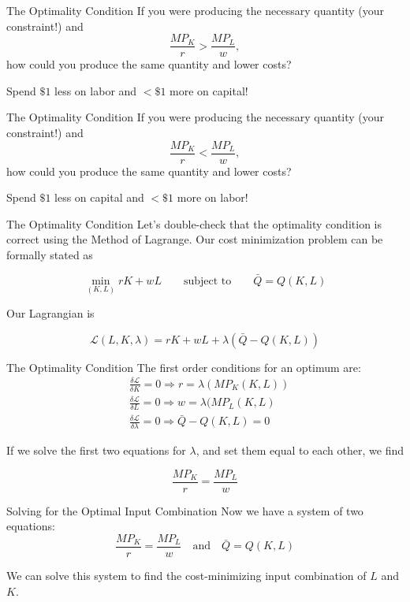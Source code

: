 \documentclass[11pt,t]{beamer}
\begin{document}
\begin{frame}{The Optimality Condition}
  If you were producing the necessary quantity (your constraint!) and 
  $$
    \frac{MP_K}{r} > \frac{MP_L}{w},
  $$
  how could you produce the same quantity and lower costs?

  \pause\bigskip
  Spend $\$1$ less on labor and $<\$1$ more on capital!
\end{frame}

\begin{frame}{The Optimality Condition}
  If you were producing the necessary quantity (your constraint!) and 
  $$
    \frac{MP_K}{r} < \frac{MP_L}{w},
  $$
  how could you produce the same quantity and lower costs?

  \pause\bigskip
  Spend $\$1$ less on capital and $<\$1$ more on labor!
\end{frame}


\begin{frame}{The Optimality Condition}
  Let's double-check that the optimality condition is correct using the Method of Lagrange. Our cost minimization problem can be formally stated as

  $$
    \min_{(K,L)} rK + wL \qquad \text{subject to} \qquad \bar{Q} = Q(K,L)
  $$

  \bigskip
  Our Lagrangian is

  $$
    \mathcal{L}(L,K,\lambda) = rK + wL + \lambda(\bar{Q} - Q(K,L))
  $$
\end{frame}

\begin{frame}{The Optimality Condition}
  The first order conditions for an optimum are:
  \begin{align*}
      & \frac{\delta \mathcal{L}}{\delta K}=0 \Rightarrow r = \lambda(MP_K(K,L))      \\
      & \frac{\delta \mathcal{L}}{\delta L}=0 \Rightarrow w = \lambda(MP_L(K,L)       \\
      & \frac{\delta \mathcal{L}}{\delta \lambda}=0 \Rightarrow \bar{Q} - Q(K,L) = 0
  \end{align*}

  If we solve the first two equations for $\lambda$, and set them equal to each other, we find
  
  $$
    \frac{MP_K}{r} = \frac{MP_L}{w}
  $$
\end{frame}

\begin{frame}{Solving for the Optimal Input Combination}
  Now we have a system of two equations:
  $$
    \frac{MP_K}{r} = \frac{MP_L}{w} \quad\text{and}\quad \bar{Q} = Q(K,L)
  $$

  \bigskip We can solve this system to find the cost-minimizing input combination of $L$ and $K$.
\end{frame}
\end{document}
